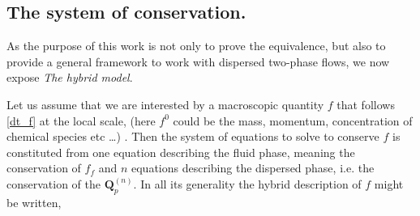 \subsection{The system of conservation.}

As the purpose of this work is not only to prove the equivalence, but also to provide a general framework to work with dispersed two-phase flows, we now expose \textit{The hybrid model}.

Let us assume that we are interested by a macroscopic quantity $f$ that follows \ref{dt_f} at the local scale, (here $f^0$ could be the mass, momentum, concentration of chemical species etc \ldots) . 
Then the system of equations to solve to conserve $f$ is constituted from one equation describing the fluid phase, meaning the conservation of $f_f$ and $n$ equations describing the dispersed phase, i.e. the conservation of the $\textbf{Q}_p^{(n)}$.  
In all its generality the hybrid description of $f$ might be written,
